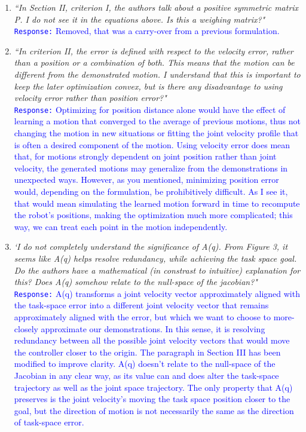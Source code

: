 \documentclass[10pt,stdletter,dateno]{newlfm}
\begin{document}
\begin{newlfm}
\begin{enumerate}
\item \textit{``In Section II, criterion I, the authors talk about a positive symmetric matrix P. I do not see it in the
equations above. Is this a weighing matrix?"}\\
\textcolor{blue}{\texttt{Response:} \small Removed, that was a carry-over from a previous formulation.}\\

\item \textit{``In criterion II, the error is defined with respect to the velocity error, rather than a position or a combination
of both. This means that the motion can be different from the demonstrated motion. I understand
that this is important to keep the later optimization convex, but is there any disadvantage to using
velocity error rather than position error?"}\\
\textcolor{blue}{\texttt{Response:} \small Optimizing for position distance alone would have the effect of learning a motion that converged to the average of previous motions, thus not changing the motion in new situations or fitting the joint velocity profile that is often a desired component of the motion. Using velocity error does mean that, for motions strongly dependent on joint position rather than joint velocity, the generated motions may generalize from the demonstrations in unexpected ways. However, as you mentioned, minimizing position error would, depending on the formulation, be prohibitively difficult. As I see it, that would mean simulating the learned motion forward in time to recompute the robot's positions, making the optimization much more complicated; this way, we can treat each point in the motion independently.}\\

\item \textit{`I do not completely understand the significance of A(q). From Figure 3, it seems like A(q) helps resolve
redundancy, while achieving the task space goal. Do the authors have a mathematical (in constrast to
intuitive) explanation for this? Does A(q) somehow relate to the null-space of the jacobian?"}\\
\textcolor{blue}{\texttt{Response:} \small A(q) transforms a joint velocity vector approximately aligned with the task-space error into a different joint velocity vector that remains approximately aligned with the error, but which we want to choose to more-closely approximate our demonstrations. In this sense, it is resolving redundancy between all the possible joint velocity vectors that would move the controller closer to the origin. The paragraph in Section III has been modified to improve clarity. A(q) doesn't relate to the null-space of the Jacobian in any clear way, as its value can and does alter the task-space trajectory as well as the joint space trajectory. The only property that A(q) preserves is the joint velocity's moving the task space position closer to the goal, but the direction of motion is not necessarily the same as the direction of task-space error.}\\


\end{enumerate}
\end{newlfm}
\end{document}
